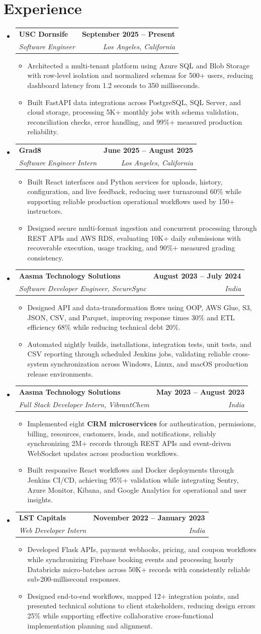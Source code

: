 \documentclass[letterpaper,10pt]{article}
\makeatletter
\newcommand{\itemTail}{\vspace{-4pt}}
\newcommand{\sectionGap}{\vspace{-8pt}}
\newcommand{\roleGap}{\vspace{2pt}}
\newcommand{\resumeItem}[1]{\item\small{{#1 \itemTail}}}
\newcommand{\resumeSubheading}[4]{\vspace{-1pt}\item\begin{tabular*}{1.0\textwidth}[t]{l@{\extracolsep{\fill}}r}\textbf{#1} & \textbf{\small #2} \\\textit{\small#3} & \textit{\small #4} \\\end{tabular*}\vspace{-2pt}}
\newcommand{\resumeSubHeadingListStart}{\begin{itemize}[leftmargin=0.0in, label={}]}
\newcommand{\resumeSubHeadingListEnd}{\end{itemize}}
\newcommand{\resumeItemListStart}{\begin{itemize}[leftmargin=0.15in,label=\textbullet,itemsep=3pt,topsep=0pt,parsep=0pt,partopsep=0pt]}
\newcommand{\resumeItemListEnd}{\end{itemize}\vspace{-4pt}}
\makeatother
\begin{document}
\section{Experience}
\resumeSubHeadingListStart
\resumeSubheading{USC Dornsife}{September 2025 -- Present}{Software Engineer}{Los Angeles, California}
\resumeItemListStart
\resumeItem{Architected a multi-tenant platform using Azure SQL and Blob Storage with row-level isolation and normalized schemas for 500+ users, reducing dashboard latency from 1.2 seconds to 350 milliseconds.}
\resumeItem{Built FastAPI data integrations across PostgreSQL, SQL Server, and cloud storage, processing 5K+ monthly jobs with schema validation, reconciliation checks, error handling, and 99\%+ measured production reliability.}
\resumeItemListEnd
\roleGap
\resumeSubheading{Grad8}{June 2025 -- August 2025}{Software Engineer Intern}{Los Angeles, California}
\resumeItemListStart
\resumeItem{Built React interfaces and Python services for uploads, history, configuration, and live feedback, reducing user turnaround 60\% while supporting reliable production operational workflows used by 150+ instructors.}
\resumeItem{Designed secure multi-format ingestion and concurrent processing through REST APIs and AWS RDS, evaluating 10K+ daily submissions with recoverable execution, usage tracking, and 90\%+ measured grading consistency.}
\resumeItemListEnd
\roleGap
\resumeSubheading{Aasma Technology Solutions}{August 2023 -- July 2024}{Software Developer Engineer, SecureSync}{India}
\resumeItemListStart
\resumeItem{Designed API and data-transformation flows using OOP, AWS Glue, S3, JSON, CSV, and Parquet, improving response times 30\% and ETL efficiency 68\% while reducing technical debt 20\%.}
\resumeItem{Automated nightly builds, installations, integration tests, unit tests, and CSV reporting through scheduled Jenkins jobs, validating reliable cross-system synchronization across Windows, Linux, and macOS production release environments.}
\resumeItemListEnd
\roleGap
\resumeSubheading{Aasma Technology Solutions}{May 2023 -- August 2023}{Full Stack Developer Intern, VibrantChem}{India}
\resumeItemListStart
\resumeItem{Implemented eight \textbf{CRM microservices} for authentication, permissions, billing, resources, customers, leads, and notifications, reliably synchronizing 2M+ records through REST APIs and event-driven WebSocket updates across production workflows.}
\resumeItem{Built responsive React workflows and Docker deployments through Jenkins CI/CD, achieving 95\%+ validation while integrating Sentry, Azure Monitor, Kibana, and Google Analytics for operational and user insights.}
\resumeItemListEnd
\roleGap
\resumeSubheading{LST Capitals}{November 2022 -- January 2023}{Web Developer Intern}{India}
\resumeItemListStart
\resumeItem{Developed Flask APIs, payment webhooks, pricing, and coupon workflows while synchronizing Firebase booking events and processing hourly Databricks micro-batches across 50K+ records with consistently reliable sub-200-millisecond responses.}
\resumeItem{Designed end-to-end workflows, mapped 12+ integration points, and presented technical solutions to client stakeholders, reducing design errors 25\% while supporting effective collaborative cross-functional implementation planning and alignment.}
\resumeItemListEnd
\resumeSubHeadingListEnd
\sectionGap
\end{document}
